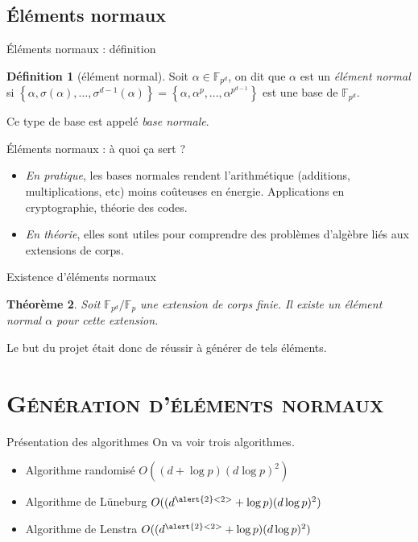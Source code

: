 \documentclass[xcolor=x11names,compress]{beamer}
\theoremstyle{break}
\newtheorem{thm}{Théorème}[section]
\theoremstyle{sc}
\theoremstyle{definition}
\newtheorem{defi}[thm]{Définition}
\theoremstyle{remark}
\begin{document}
\subsection{Éléments normaux}
\begin{frame}{Éléments normaux : définition}
  \begin{defi}[élément normal]
    Soit $\alpha\in\mathbb{F}_{p^d}$, on dit que $\alpha$ est un \emph{élément
    normal} si $\left\{ \alpha, \sigma(\alpha), \dots, \sigma^{d-1}(\alpha)
  \right\} = \left\{ \alpha, \alpha^p, \dots, \alpha^{p^{d-1}} \right\}$ est une
  base de $\mathbb{F}_{p^d}$.
  \end{defi}
  Ce type de base est appelé \emph{base normale}.
\end{frame}

\begin{frame}{Éléments normaux : à quoi ça sert ?}
  \begin{itemize}
    \item \emph{En pratique}, les bases normales rendent l'arithmétique (additions,
      multiplications, etc) moins coûteuses en énergie. Applications en
      cryptographie, théorie des codes.
    \item \emph{En théorie}, elles sont utiles pour comprendre des problèmes
      d'algèbre liés aux extensions de corps.
  \end{itemize}
\end{frame}
\begin{frame}{Existence d'éléments normaux}
  \begin{thm}
    Soit $\mathbb{F}_{p^d}/\mathbb{F}_p$ une extension de corps finie. Il existe
    un élément normal $\alpha$ pour cette extension.
  \end{thm}
  Le but du projet était donc de réussir à générer de tels éléments.
\end{frame}

\section{\scshape Génération d'éléments normaux}
\begin{frame}{Présentation des algorithmes}
  On va voir trois algorithmes.

  \begin{itemize}
    \item Algorithme randomisé $O((d+\log p)(d\log p)^2)$
    \item Algorithme de Lüneburg $O((d^{\alert{2}<2>}+\log p)(d\log p)^2)$
    \item Algorithme de Lenstra $O((d^{\alert{2}<2>}+\log p)(d\log p)^2)$
  \end{itemize}

\end{frame}
\end{document}
